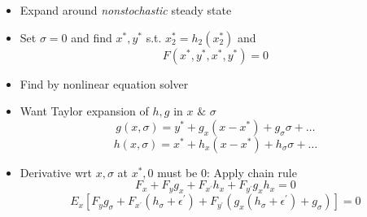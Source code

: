 \documentclass[bigger,handout]{beamer}
\begin{document}
\begin{frame}%
 

\begin{itemize}
\item Expand around \emph{nonstochastic} steady state
\item Set $\sigma=0$ and find $x^*,y^*$ s.t. $x_2^{*}=h_2(x_2^{*})$ and
\begin{equation*}
F(x^{*},y^{*},x^{*},y^{*})=0
\end{equation*}
\item Find by nonlinear equation solver
\item Want Taylor expansion of $h,g$ in $x$ $\&$ $\sigma$
\begin{equation*}
g(x,\sigma)=y^{*}+g_{x}(x-x^{*})+g_{\sigma}\sigma +\ldots
\end{equation*}
\begin{equation*}
h(x,\sigma)=x^{*}+h_{x}(x-x^{*})+h_{\sigma}\sigma +\ldots
\end{equation*}
\item Derivative wrt $x,\sigma$ at $x^{*},0$ must be 0: Apply chain rule
\begin{equation} \label{xderiv}
F_{x}+F_{y}g_{x}+F_{x^{\prime}}h_{x}+F_{y^{\prime}}g_{x}h_{x}=0
\end{equation}
\begin{equation} \label{sigderiv}
E_x[F_{y}g_{\sigma}+F_{x^{\prime}}(h_{\sigma}+\epsilon^{\prime})+F_{y^{\prime}}(g_{x}(h_{\sigma}+\epsilon^{\prime})+g_{\sigma})]=0
\end{equation}

\end{itemize}

\end{frame}%
\end{document}
